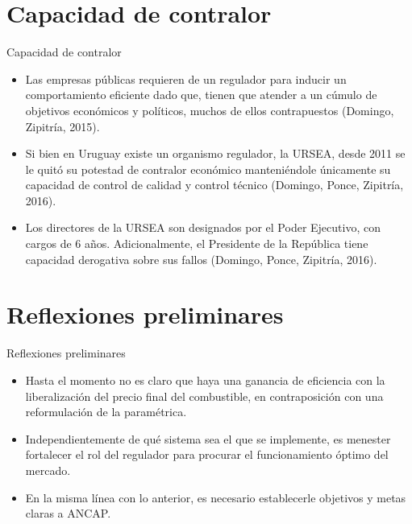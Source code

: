 \documentclass[10pt]{beamer}
\begin{document}
\section{Capacidad de contralor}
\begin{frame}{Capacidad de contralor}
\begin{itemize}
\item Las empresas públicas requieren de un regulador para inducir un comportamiento eficiente dado que, tienen que atender a un cúmulo de objetivos económicos y políticos, muchos de ellos contrapuestos (Domingo, Zipitría, 2015).
\item Si bien en Uruguay existe un organismo regulador, la URSEA, desde 2011 se le quitó su potestad de contralor económico manteniéndole únicamente su capacidad de control de calidad y control técnico (Domingo, Ponce, Zipitría, 2016).
\item Los directores de la URSEA son designados por el Poder Ejecutivo, con cargos de 6 años. Adicionalmente, el Presidente de la República tiene capacidad derogativa sobre sus fallos (Domingo, Ponce, Zipitría, 2016). 
\end{itemize}
\end{frame}

\section{Reflexiones preliminares}

\begin{frame}{Reflexiones preliminares}
\begin{itemize}
\item Hasta el momento no es claro que haya una ganancia de eficiencia con la liberalización del precio final del combustible, en contraposición con una reformulación de la paramétrica.
\item Independientemente de qué sistema sea el que se implemente, es menester fortalecer el rol del regulador para procurar el funcionamiento óptimo del mercado.
\item En la misma línea con lo anterior, es necesario establecerle objetivos y metas claras a ANCAP.
\end{itemize}
\end{frame}
\end{document}
